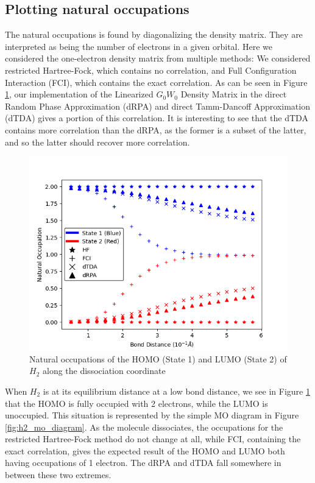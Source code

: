 \documentclass[12pt]{caltech_thesis}
\begin{document}
\subsection{Plotting natural occupations}
The natural occupations is found by diagonalizing the density matrix. They are interpreted as being the number of electrons in a given orbital.\autocite{szabo_modern_2012} Here we considered the one-electron density matrix from multiple methods: We considered restricted Hartree-Fock, which contains no correlation, and Full Configuration Interaction (FCI), which contains the exact correlation. As can be seen in Figure \ref{fig:h2_dissociation}, our implementation of the Linearized $G_0W_0$ Density Matrix in the direct Random Phase Approximation (dRPA) and direct Tamm-Dancoff Approximation (dTDA) gives a portion of this correlation. It is interesting to see that the dTDA contains more correlation than the dRPA, as the former is a subset of the latter, and so the latter should recover more correlation.
\begin{figure}[h]
    \centering
    \includegraphics[width=\textwidth]{h2_occupations.png}
\caption{Natural occupations of the HOMO (State 1) and LUMO (State 2) of $H_2$ along the dissociation coordinate}
\label{fig:h2_dissociation}
\end{figure}
When $H_2$ is at its equilibrium distance at a low bond distance, we see in Figure \ref{fig:h2_dissociation} that the HOMO is fully occupied with 2 electrons, while the LUMO is unoccupied. This situation is represented by the simple MO diagram in Figure \ref{fig:h2_mo_diagram}. As the molecule dissociates, the occupations for the restricted Hartree-Fock method do not change at all, while FCI, containing the exact correlation, gives the expected result of the HOMO and LUMO both having occupations of 1 electron. The dRPA and dTDA fall somewhere in between these two extremes.
\end{document}

